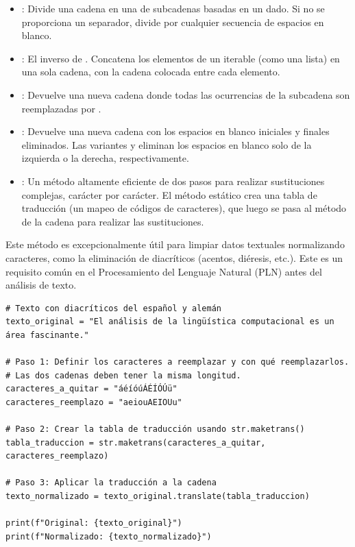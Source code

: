 \begin{itemize}
    \item \textbf{}: Divide una cadena en una  de subcadenas basadas en un  dado. Si no se proporciona un separador, divide por cualquier secuencia de espacios en blanco.
    
    \item \textbf{}: El inverso de . Concatena los elementos de un iterable (como una lista) en una sola cadena, con la cadena  colocada entre cada elemento.
    
    \item \textbf{}: Devuelve una nueva cadena donde todas las ocurrencias de la subcadena  son reemplazadas por .
    
    \item \textbf{}: Devuelve una nueva cadena con los espacios en blanco iniciales y finales eliminados. Las variantes  y  eliminan los espacios en blanco solo de la izquierda o la derecha, respectivamente.

    \item \textbf{}: Un método altamente eficiente de dos pasos para realizar sustituciones complejas, carácter por carácter. El método estático  crea una tabla de traducción (un mapeo de códigos de caracteres), que luego se pasa al método  de la cadena para realizar las sustituciones.
\end{itemize}

\begin{example}
Este método es excepcionalmente útil para limpiar datos textuales normalizando caracteres, como la eliminación de diacríticos (acentos, diéresis, etc.). Este es un requisito común en el Procesamiento del Lenguaje Natural (PLN) antes del análisis de texto.
\text{ }\begin{verbatim}
# Texto con diacríticos del español y alemán
texto_original = "El análisis de la lingüística computacional es un área fascinante."

# Paso 1: Definir los caracteres a reemplazar y con qué reemplazarlos.
# Las dos cadenas deben tener la misma longitud.
caracteres_a_quitar = "áéíóúÁÉÍÓÚü"
caracteres_reemplazo = "aeiouAEIOUu"

# Paso 2: Crear la tabla de traducción usando str.maketrans()
tabla_traduccion = str.maketrans(caracteres_a_quitar, caracteres_reemplazo)

# Paso 3: Aplicar la traducción a la cadena
texto_normalizado = texto_original.translate(tabla_traduccion)

print(f"Original: {texto_original}")
print(f"Normalizado: {texto_normalizado}")
\end{verbatim}
\end{example}

